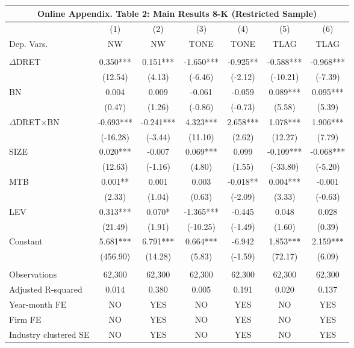 \begin{table}[htbp] \label{oat2}
  \centering
    \begin{tabular}{lcccccc}
    \multicolumn{7}{c}{\textbf{Online Appendix. Table 2: Main Results 8-K (Restricted Sample)}} \\
    \midrule
      & (1) & (2) & (3) & (4) & (5) & (6) \\
    Dep. Vars. & NW & NW & TONE & TONE & TLAG & TLAG \\
    \midrule
      &   &   &   &   &   &  \\
    $\Delta$DRET & 0.350*** & 0.151*** & -1.650*** & -0.925** & -0.588*** & -0.968*** \\
    & (12.54) & (4.13) & (-6.46) & (-2.12) & (-10.21) & (-7.39) \\
    BN & 0.004 & 0.009 & -0.061 & -0.059 & 0.089*** & 0.095*** \\
    & (0.47) & (1.26) & (-0.86) & (-0.73) & (5.58) & (5.39) \\
    \rowcolor[rgb]{ .933,  .925,  .882} $\Delta$DRET$\times$BN & -0.693*** & -0.241*** & 4.323*** & 2.658*** & 1.078*** & 1.906*** \\
    \rowcolor[rgb]{ .933,  .925,  .882}   & (-16.28) & (-3.44) & (11.10) & (2.62) & (12.27) & (7.79) \\
    SIZE & 0.020*** & -0.007 & 0.069*** & 0.099 & -0.109*** & -0.068*** \\
    & (12.63) & (-1.16) & (4.80) & (1.55) & (-33.80) & (-5.20) \\
    MTB & 0.001** & 0.001 & 0.003 & -0.018** & 0.004*** & -0.001 \\
    & (2.33) & (1.04) & (0.63) & (-2.09) & (3.33) & (-0.63) \\
    LEV & 0.313*** & 0.070* & -1.365*** & -0.445 & 0.048 & 0.028 \\
    & (21.49) & (1.91) & (-10.25) & (-1.49) & (1.60) & (0.39) \\
    Constant & 5.681*** & 6.791*** & 0.664*** & -6.942 & 1.853*** & 2.159*** \\
    & (456.90) & (14.28) & (5.83) & (-1.59) & (72.17) & (6.09) \\
    &   &   &   &   &   &  \\
    Observations & 62,300 & 62,300 & 62,300 & 62,300 & 62,300 & 62,300 \\
    Adjusted R-squared & 0.014 & 0.380 & 0.005 & 0.191 & 0.020 & 0.137 \\
    Year-month FE & NO & YES & NO & YES & NO & YES \\
    Firm FE & NO & YES & NO & YES & NO & YES \\
    Industry clustered SE & NO & YES & NO & YES & NO & YES \\
    \bottomrule
    \end{tabular}%
\end{table}%
